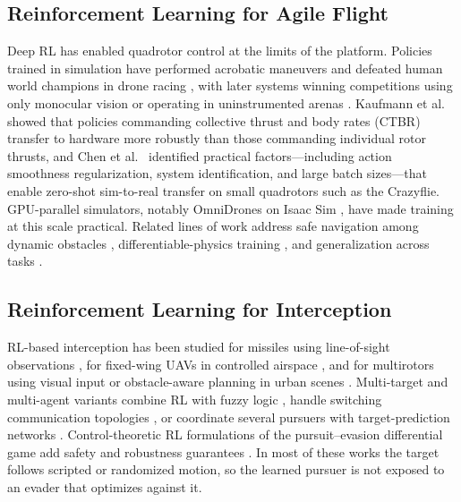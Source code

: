 \subsection{Reinforcement Learning for Agile Flight}
\noindent
Deep RL has enabled quadrotor control at the limits of the platform. Policies trained in simulation have performed acrobatic maneuvers \cite{kaufmannDeepDroneAcrobatics2021} and defeated human world champions in drone racing \cite{kaufmannChampionlevelDroneRacing2023a}, with later systems winning competitions using only monocular vision \cite{bahnamMonoRaceWinningChampionLevel2026} or operating in uninstrumented arenas \cite{boselloYourOwnProLevel2026}. Kaufmann et al.\ \cite{kaufmannBenchmarkComparisonLearned2022} showed that policies commanding collective thrust and body rates (CTBR) transfer to hardware more robustly than those commanding individual rotor thrusts, and Chen et al.\ \cite{chenWhatMattersLearning2025a} identified practical factors---including action smoothness regularization, system identification, and large batch sizes---that enable zero-shot sim-to-real transfer on small quadrotors such as the Crazyflie. GPU-parallel simulators, notably OmniDrones on Isaac Sim \cite{xuOmniDronesEfficientFlexible2023}, have made training at this scale practical. Related lines of work address safe navigation among dynamic obstacles \cite{xuNavRLLearningSafe2025, ugurluSimtoRealDeepReinforcement2022}, differentiable-physics training \cite{zhangLearningVisionbasedAgile2025, gurumurthyDeepOffPolicyIterative2023}, and generalization across tasks \cite{greenBridgingPerformanceGeneralization2026}.

\subsection{Reinforcement Learning for Interception}
\noindent
RL-based interception has been studied for missiles using line-of-sight observations \cite{huInterceptGuidanceManeuvering2023}, for fixed-wing UAVs in controlled airspace \cite{giralInterceptingUnauthorizedAerial2024}, and for multirotors using visual input \cite{darwishDroneNavigationTarget2023} or obstacle-aware planning in urban scenes \cite{lucotteInterceptionAdversarialDrones2026}. Multi-target and multi-agent variants combine RL with fuzzy logic \cite{xiaUAVMultiDynamicTarget2024}, handle switching communication topologies \cite{fanSwitchingawareMultiagentDeep2023}, or coordinate several pursuers with target-prediction networks \cite{zhangGameDronesMultiUAV2023, chenOnlinePlanningMultiUAV2025}. Control-theoretic RL formulations of the pursuit--evasion differential game add safety and robustness guarantees \cite{wangReinforcementLearningPursuitevasion2025}. In most of these works the target follows scripted or randomized motion, so the learned pursuer is not exposed to an evader that optimizes against it.

